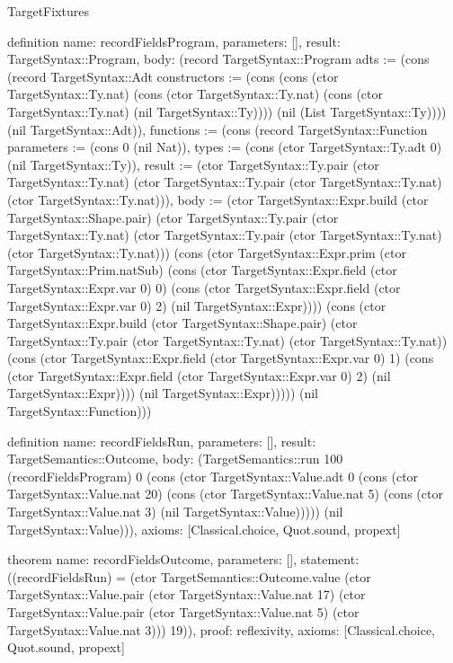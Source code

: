 \begin{lexlean}{TargetFixtures}
\begin{semanticmodule}
definition{
  name: recordFieldsProgram,
  parameters: [],
  result: TargetSyntax::Program,
  body: (record TargetSyntax::Program {adts := (cons (record TargetSyntax::Adt {constructors := (cons (cons (ctor TargetSyntax::Ty.nat) (cons (ctor TargetSyntax::Ty.nat) (cons (ctor TargetSyntax::Ty.nat) (nil TargetSyntax::Ty)))) (nil (List TargetSyntax::Ty)))}) (nil TargetSyntax::Adt)), functions := (cons (record TargetSyntax::Function {parameters := (cons 0 (nil Nat)), types := (cons (ctor TargetSyntax::Ty.adt 0) (nil TargetSyntax::Ty)), result := (ctor TargetSyntax::Ty.pair (ctor TargetSyntax::Ty.nat) (ctor TargetSyntax::Ty.pair (ctor TargetSyntax::Ty.nat) (ctor TargetSyntax::Ty.nat))), body := (ctor TargetSyntax::Expr.build (ctor TargetSyntax::Shape.pair) (ctor TargetSyntax::Ty.pair (ctor TargetSyntax::Ty.nat) (ctor TargetSyntax::Ty.pair (ctor TargetSyntax::Ty.nat) (ctor TargetSyntax::Ty.nat))) (cons (ctor TargetSyntax::Expr.prim (ctor TargetSyntax::Prim.natSub) (cons (ctor TargetSyntax::Expr.field (ctor TargetSyntax::Expr.var 0) 0) (cons (ctor TargetSyntax::Expr.field (ctor TargetSyntax::Expr.var 0) 2) (nil TargetSyntax::Expr)))) (cons (ctor TargetSyntax::Expr.build (ctor TargetSyntax::Shape.pair) (ctor TargetSyntax::Ty.pair (ctor TargetSyntax::Ty.nat) (ctor TargetSyntax::Ty.nat)) (cons (ctor TargetSyntax::Expr.field (ctor TargetSyntax::Expr.var 0) 1) (cons (ctor TargetSyntax::Expr.field (ctor TargetSyntax::Expr.var 0) 2) (nil TargetSyntax::Expr)))) (nil TargetSyntax::Expr))))}) (nil TargetSyntax::Function))})
}

definition{
  name: recordFieldsRun,
  parameters: [],
  result: TargetSemantics::Outcome,
  body: (TargetSemantics::run 100 (recordFieldsProgram) 0 (cons (ctor TargetSyntax::Value.adt 0 (cons (ctor TargetSyntax::Value.nat 20) (cons (ctor TargetSyntax::Value.nat 5) (cons (ctor TargetSyntax::Value.nat 3) (nil TargetSyntax::Value))))) (nil TargetSyntax::Value))),
  axioms: [Classical.choice, Quot.sound, propext]
}

theorem{
  name: recordFieldsOutcome,
  parameters: [],
  statement: ((recordFieldsRun) = (ctor TargetSemantics::Outcome.value (ctor TargetSyntax::Value.pair (ctor TargetSyntax::Value.nat 17) (ctor TargetSyntax::Value.pair (ctor TargetSyntax::Value.nat 5) (ctor TargetSyntax::Value.nat 3))) 19)),
  proof: reflexivity{},
  axioms: [Classical.choice, Quot.sound, propext]
}


\end{semanticmodule}
\end{lexlean}
